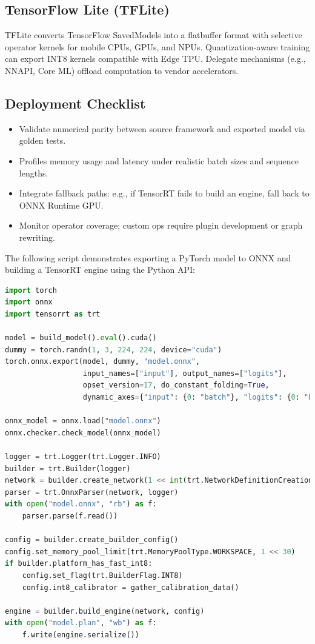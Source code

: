 \documentclass{article}
\begin{document}
\subsection{TensorFlow Lite (TFLite)}
TFLite converts TensorFlow SavedModels into a flatbuffer format with selective operator kernels for mobile CPUs, GPUs, and NPUs. Quantization-aware training can export INT8 kernels compatible with Edge TPU. Delegate mechanisms (e.g., NNAPI, Core ML) offload computation to vendor accelerators.

\subsection{Deployment Checklist}
\begin{itemize}
  \item Validate numerical parity between source framework and exported model via golden tests.
  \item Profiles memory usage and latency under realistic batch sizes and sequence lengths.
  \item Integrate fallback paths: e.g., if TensorRT fails to build an engine, fall back to ONNX Runtime GPU.
  \item Monitor operator coverage; custom ops require plugin development or graph rewriting.
\end{itemize}
The following script demonstrates exporting a PyTorch model to ONNX and building a TensorRT engine using the Python API:

\begin{lstlisting}[language=Python, caption={PyTorch to ONNX export and TensorRT engine building.}]
import torch
import onnx
import tensorrt as trt

model = build_model().eval().cuda()
dummy = torch.randn(1, 3, 224, 224, device="cuda")
torch.onnx.export(model, dummy, "model.onnx",
                  input_names=["input"], output_names=["logits"],
                  opset_version=17, do_constant_folding=True,
                  dynamic_axes={"input": {0: "batch"}, "logits": {0: "batch"}})

onnx_model = onnx.load("model.onnx")
onnx.checker.check_model(onnx_model)

logger = trt.Logger(trt.Logger.INFO)
builder = trt.Builder(logger)
network = builder.create_network(1 << int(trt.NetworkDefinitionCreationFlag.EXPLICIT_BATCH))
parser = trt.OnnxParser(network, logger)
with open("model.onnx", "rb") as f:
    parser.parse(f.read())

config = builder.create_builder_config()
config.set_memory_pool_limit(trt.MemoryPoolType.WORKSPACE, 1 << 30)
if builder.platform_has_fast_int8:
    config.set_flag(trt.BuilderFlag.INT8)
    config.int8_calibrator = gather_calibration_data()

engine = builder.build_engine(network, config)
with open("model.plan", "wb") as f:
    f.write(engine.serialize())
\end{lstlisting}
\end{document}
